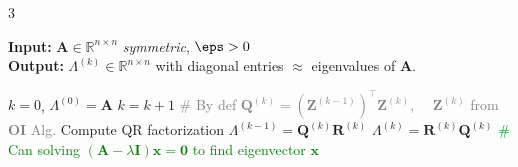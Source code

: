 \documentclass{note}
\begin{document}
\begin{multicols}{3}
\begin{algorithm}[H]
\tiny
\caption*{\textbf{QR-Eig} QR Algorithm for Eigenvalues \quad {}}
\textbf{Input:} $\mathbf{A} \in \mathbb{R}^{n \times n}$ \textit{symmetric}, $\eps>0$ \\
\textbf{Output:} $\Lambda^{(k)} \in \mathbb{R}^{n \times n}$ with diagonal entries $\approx$ eigenvalues of $\mathbf{A}$.
\begin{algorithmic}[1]
  \State $k = 0$, $\Lambda^{(0)} = \mathbf{A}$
    \State $k = k + 1$ \quad \textcolor{gray}{\tiny \# By def $\mathbf{Q}^{(k)}=(\mathbf{Z}^{(k-1)})^\top\mathbf{Z}^{(k)}$, \ \ $\mathbf{Z}^{(k)}$ from \textbf{OI} Alg.}
    \State Compute QR factorization $\Lambda^{(k-1)} = \mathbf{Q}^{(k)} \mathbf{R}^{(k)}$
    \State $\Lambda^{(k)} = \mathbf{R}^{(k)} \mathbf{Q}^{(k)}$
  \EndWhile \quad \textcolor{green}{\tiny \# Can solving $(\mathbf{A}-\lambda \mathbf{I})\mathbf{x}=\mathbf{0}$ to find eigenvector $\mathbf{x}$}
\end{algorithmic}
\end{algorithm}

\end{multicols}

\vspace{-27pt}
\end{document}
